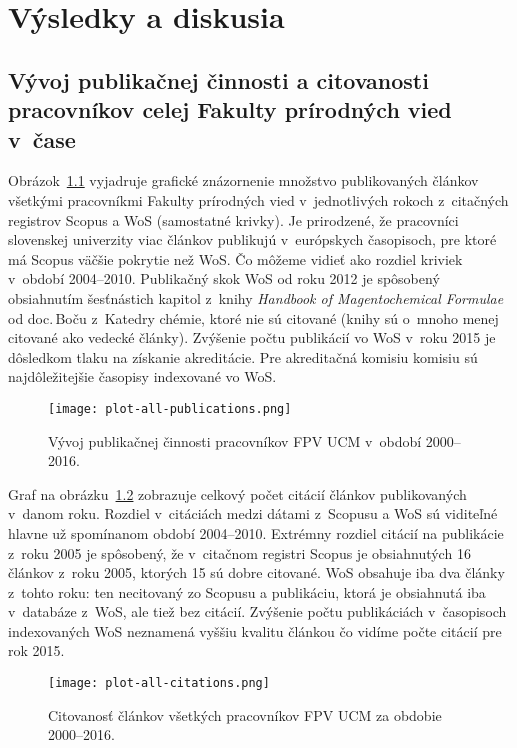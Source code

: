 \chapter{Výsledky a diskusia}

\section{Vývoj publikačnej činnosti a citovanosti pracovníkov celej Fakulty
  prírodných vied v~čase}

Obrázok~\ref{fig:plot.all.publications} vyjadruje grafické znázornenie množstvo
publikovaných článkov všetkými pracovníkmi Fakulty prírodných vied
v~jednotlivých rokoch z~citačných registrov Scopus a WoS (samostatné krivky).
Je prirodzené, že pracovníci slovenskej univerzity viac článkov publikujú
v~európskych časopisoch, pre ktoré má Scopus väčšie pokrytie než WoS.  Čo môžeme
vidieť ako rozdiel kriviek v~období 2004--2010.  Publikačný skok WoS od roku
2012 je spôsobený obsiahnutím šesťnástich kapitol z~knihy \emph{Handbook of
  Magentochemical Formulae} od doc.\,Boču z~Katedry chémie, ktoré nie sú
citované (knihy sú o~mnoho menej citované ako vedecké články).  Zvýšenie počtu
publikácií vo WoS v~roku 2015 je dôsledkom tlaku na získanie akreditácie.  Pre
akreditačná komisiu komisiu sú najdôležitejšie časopisy indexované vo WoS.

\begin{figure}
  \centering
  \texttt{[image: plot-all-publications.png]}
  \caption{Vývoj publikačnej činnosti pracovníkov FPV UCM v~období 2000--2016.}
  \label{fig:plot.all.publications}
\end{figure}

Graf na obrázku~\ref{fig:plot.all.citations} zobrazuje celkový počet citácií
článkov publikovaných v~danom roku.  Rozdiel v~citáciách medzi dátami z~Scopusu
a WoS sú viditeľné hlavne už spomínanom období 2004--2010.  Extrémny rozdiel
citácií na publikácie z~roku 2005 je spôsobený, že v~citačnom registri Scopus je
obsiahnutých 16 článkov z~roku 2005, ktorých 15 sú dobre citované.  WoS obsahuje
iba dva články z~tohto roku: ten necitovaný zo Scopusu a publikáciu, ktorá je
obsiahnutá iba v~databáze z~WoS, ale tiež bez citácií.  Zvýšenie počtu
publikáciách v~časopisoch indexovaných WoS neznamená vyššiu kvalitu článkou čo
vidíme počte citácií pre rok 2015.

\begin{figure}
  \centering
  \texttt{[image: plot-all-citations.png]}
  \caption{Citovanosť článkov všetkých pracovníkov FPV UCM za obdobie
    2000--2016.}
  \label{fig:plot.all.citations}
\end{figure}



